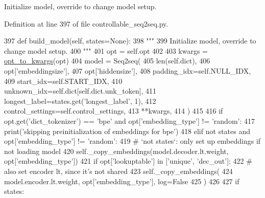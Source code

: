 \begin{DoxyVerb}Initialize model, override to change model setup.
\end{DoxyVerb}
 

Definition at line 397 of file controllable\+\_\+seq2seq.\+py.


\begin{DoxyCode}
397     \textcolor{keyword}{def }build\_model(self, states=None):
398         \textcolor{stringliteral}{"""}
399 \textcolor{stringliteral}{        Initialize model, override to change model setup.}
400 \textcolor{stringliteral}{        """}
401         opt = self.opt
402 
403         kwargs = \hyperlink{namespaceparlai_1_1agents_1_1legacy__agents_1_1seq2seq_1_1modules__v1_af13e3733abb5828b0c0a75d95833441c}{opt\_to\_kwargs}(opt)
404         model = Seq2seq(
405             len(self.dict),
406             opt[\textcolor{stringliteral}{'embeddingsize'}],
407             opt[\textcolor{stringliteral}{'hiddensize'}],
408             padding\_idx=self.NULL\_IDX,
409             start\_idx=self.START\_IDX,
410             unknown\_idx=self.dict[self.dict.unk\_token],
411             longest\_label=states.get(\textcolor{stringliteral}{'longest\_label'}, 1),
412             control\_settings=self.control\_settings,
413             **kwargs,
414         )
415 
416         \textcolor{keywordflow}{if} opt.get(\textcolor{stringliteral}{'dict\_tokenizer'}) == \textcolor{stringliteral}{'bpe'} \textcolor{keywordflow}{and} opt[\textcolor{stringliteral}{'embedding\_type'}] != \textcolor{stringliteral}{'random'}:
417             print(\textcolor{stringliteral}{'skipping preinitialization of embeddings for bpe'})
418         \textcolor{keywordflow}{elif} \textcolor{keywordflow}{not} states \textcolor{keywordflow}{and} opt[\textcolor{stringliteral}{'embedding\_type'}] != \textcolor{stringliteral}{'random'}:
419             \textcolor{comment}{# `not states`: only set up embeddings if not loading model}
420             self.\_copy\_embeddings(model.decoder.lt.weight, opt[\textcolor{stringliteral}{'embedding\_type'}])
421             \textcolor{keywordflow}{if} opt[\textcolor{stringliteral}{'lookuptable'}] \textcolor{keywordflow}{in} [\textcolor{stringliteral}{'unique'}, \textcolor{stringliteral}{'dec\_out'}]:
422                 \textcolor{comment}{# also set encoder lt, since it's not shared}
423                 self.\_copy\_embeddings(
424                     model.encoder.lt.weight, opt[\textcolor{stringliteral}{'embedding\_type'}], log=\textcolor{keyword}{False}
425                 )
426 
427         \textcolor{keywordflow}{if} states:

\end{DoxyCode}

